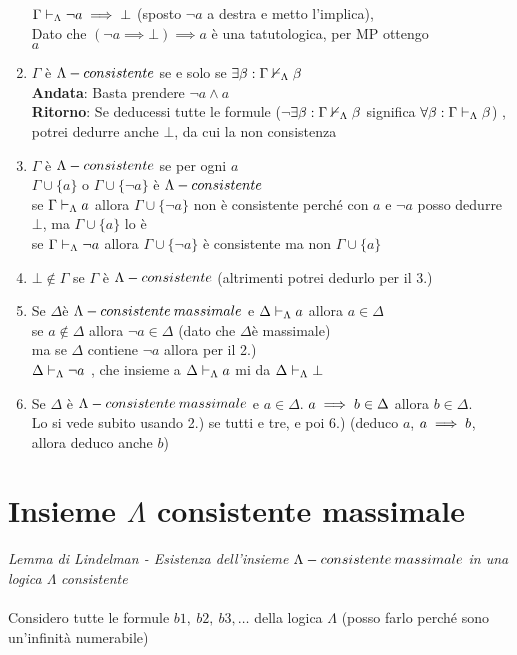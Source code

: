 \begin{enumerate}
 $\Gamma\vdash_{\Lambda}\neg a\implies\bot$ (sposto $\neg a$ a destra
e metto l'implica), \\
 Dato che $(\neg a\implies\bot)\implies a$ è una tatutologica, per
MP ottengo\\
 $a$ 
\item $\Gamma$ è $ $$\mbox{\ensuremath{\Lambda}}-consistente$ se e solo se $\exists\beta:\Gamma\nvdash_{\Lambda}\beta$
\\
 \textbf{Andata}: Basta prendere $\neg a\wedge a$\\
 \textbf{Ritorno}: Se deducessi tutte le formule ($\neg$$\exists\beta:\Gamma\nvdash_{\Lambda}\beta$
significa $\forall\beta:\Gamma\vdash_{\Lambda}\beta$) , potrei dedurre anche
$\bot$, da cui la non consistenza 
\item $\Gamma$ è $\mbox{\ensuremath{\Lambda}}-consistente$ se per ogni $a$ \\
 $\Gamma\cup\{a\}$ o $\Gamma\cup\{\neg a\}$ è $\mbox{\ensuremath{\Lambda}}-consistente$\\
 se $\Gamma\vdash_{\Lambda}a$ allora $ $$\Gamma\cup\{\neg a\}$ non è consistente
perché con $a$ e $\neg a$ posso dedurre $\bot$, ma $\Gamma\cup\{a\}$
lo è \\
 se $\Gamma\vdash_{\Lambda}\neg a$ allora $ $$\Gamma\cup\{\neg a\}$ è
consistente ma non $\Gamma\cup\{a\}$ 
\item $\bot$$\notin\Gamma$ se $\Gamma$ è $\mbox{\ensuremath{\Lambda}}-consistente$ (altrimenti potrei
dedurlo per il 3.) 
\item Se $\Delta$è $\mbox{\ensuremath{\Lambda}}-consistente\: massimale$ e $\Delta\vdash_{\Lambda}a$ allora
$a\in\Delta$\\
 se $a\notin\Delta$ allora $\neg a\in\Delta$ (dato che $\Delta$è
massimale) \\
 ma se $\Delta$ contiene $\neg a$ allora per il 2.)\\
 $\Delta\vdash_{\Lambda}\neg a$ , che insieme a $\Delta\vdash_{\Lambda}a$ mi
da $\Delta\vdash_{\Lambda}\bot$ 
\item Se $\Delta$ è $\Lambda-consistente\: massimale$ e $ $$a\in\Delta$. $a\implies b\in\Delta$
allora $b\in\Delta$. \\
 Lo si vede subito usando 2.) se tutti e tre, e poi 6.) (deduco $a$,
$a\implies b$, allora deduco anche $b$) 
\end{enumerate}

\section{Insieme $\Lambda$ consistente massimale}

\emph{\large{{{{Lemma di Lindelman - Esistenza dell'insieme $\Lambda-consistente\: massimale$}}}}}{\large{{{
}}}}\emph{\large{{{{in una logica $\Lambda$}}}}}{\large{{{
}}}}\emph{\large{{{{consistente}}}}}{\large{{{}}}}\\
 {\large{{{ }}}}\\
 {\large{{{ Considero tutte le formule $b1,\ b2,\ b3,\dots$ della
logica $\Lambda$ (posso farlo perché sono un'infinità numerabile)}}}}{\large \par}

